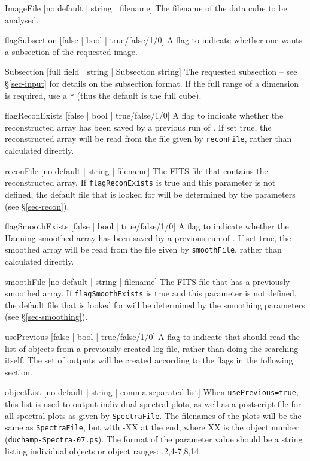\begin{Lentry}
\item[{ImageFile [no default | string | filename]}] The filename of
  the data cube to be analysed.
\item[{flagSubsection [false | bool | true/false/1/0]}] A flag to
  indicate whether one wants a subsection of the requested image.
\item[{Subsection [full field | string | Subsection string]}] The
  requested subsection -- see \S\ref{sec-input} for details on the
  subsection format.  If the full range of a dimension is required,
  use a \texttt{*} (thus the default is the full cube).
\item[{flagReconExists [false | bool | true/false/1/0]}] A flag to
  indicate whether the reconstructed array has been saved by a
  previous run of \duchamp. If set true, the reconstructed array will
  be read from the file given by \texttt{reconFile}, rather than
  calculated directly.
\item[{reconFile [no default | string | filename]}] The FITS file that
  contains the reconstructed array. If \texttt{flagReconExists} is
  true and this parameter is not defined, the default file that is
  looked for will be determined by the \atrous parameters (see
  \S\ref{sec-recon}).
\item[{flagSmoothExists [false | bool | true/false/1/0]}] A flag to
  indicate whether the Hanning-smoothed array has been saved by a
  previous run of \duchamp. If set true, the smoothed array will be
  read from the file given by \texttt{smoothFile}, rather than
  calculated directly.
\item[{smoothFile [no default | string | filename]}] The FITS file
  that has a previously smoothed array. If \texttt{flagSmoothExists}
  is true and this parameter is not defined, the default file that is
  looked for will be determined by the smoothing parameters (see
  \S\ref{sec-smoothing}).
\item[{usePrevious [false | bool | true/false/1/0]}] A flag to
  indicate that \duchamp should read the list of objects from a
  previously-created log file, rather than doing the searching
  itself. The set of outputs will be created according to the flags in
  the following section.
\item[{objectList [no default | string | comma-separated list]}] When
  \texttt{usePrevious=true}, this list is used to output individual
  spectral plots, as well as a postscript file for all spectral plots
  as given by \texttt{SpectraFile}. The filenames of the plots will be
  the same as \texttt{SpectraFile}, but with -XX at the end, where XX
  is the object number (\eg \texttt{duchamp-Spectra-07.ps}). The
  format of the parameter value should be a string listing individual
  objects or object ranges: ,2,4-7,8,14.
\end{Lentry}


